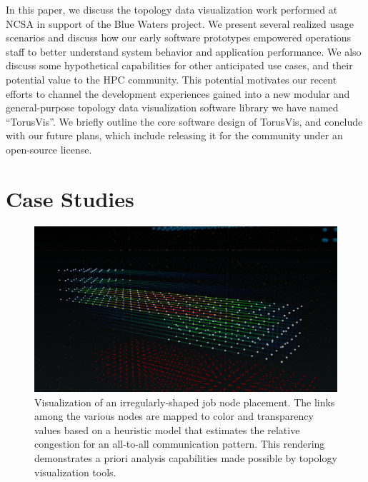 \documentclass[
    10pt,
    conference,
    compsocconf
]{IEEEtran}
\begin{document}
    In this paper, we discuss the topology data visualization work performed at
    NCSA in support of the Blue Waters project.  We present several realized
    usage scenarios and discuss how our early software prototypes empowered
    operations staff to better understand system behavior and application
    performance.  We also discuss some hypothetical capabilities for other
    anticipated use cases, and their potential value to the HPC community.  This
    potential motivates our recent efforts to channel the development
    experiences gained into a new modular and general-purpose topology data
    visualization software library we have named ``TorusVis''.  We briefly
    outline the core software design of TorusVis, and conclude with our future
    plans, which include releasing it for the community under an open-source
    license.


\section{Case Studies}
 
    \begin{figure}[!t]
        \centering
        \includegraphics[width=6.5in]{215389-all-to-all}
        \caption{
            Visualization of an irregularly-shaped job node placement.  The
            links among the various nodes are mapped to color and transparency
            values based on a heuristic model that estimates the relative
            congestion for an all-to-all communication pattern.  This rendering
            demonstrates a priori analysis capabilities made possible by
            topology visualization tools.
        }
        \label{fig_all2all}
    \end{figure}
  
\end{document}
